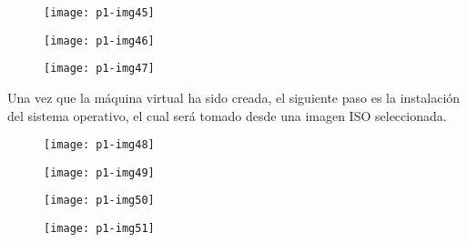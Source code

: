 \documentclass[10pt]{article}
\begin{document}
\begin{figure}[H]
	\begin{center}
 		\texttt{[image: p1-img45]}
	\end{center} 
\end{figure}

\begin{figure}[H]
	\begin{center}
 		\texttt{[image: p1-img46]}
	\end{center} 
\end{figure}

\begin{figure}[H]
	\begin{center}
 		\texttt{[image: p1-img47]}
	\end{center} 
\end{figure}

Una vez que la máquina virtual ha sido creada, el siguiente paso es la instalación del sistema operativo, el cual será tomado desde una imagen ISO seleccionada.\\

\begin{figure}[H]
	\begin{center}
 		\texttt{[image: p1-img48]}
	\end{center} 
\end{figure}

\begin{figure}[H]
	\begin{center}
 		\texttt{[image: p1-img49]}
	\end{center} 
\end{figure}

\begin{figure}[H]
	\begin{center}
 		\texttt{[image: p1-img50]}
	\end{center} 
\end{figure}

\begin{figure}[H]
	\begin{center}
 		\texttt{[image: p1-img51]}
	\end{center} 
\end{figure}
\end{document}
